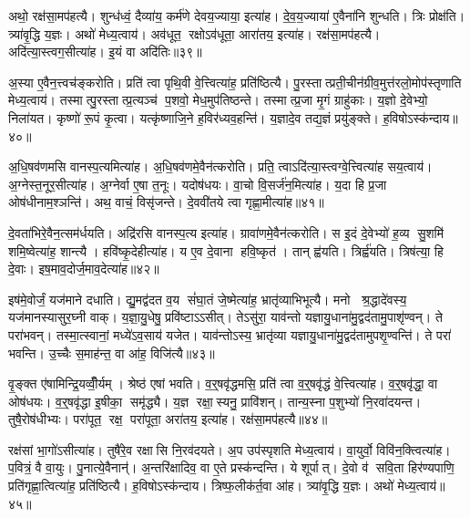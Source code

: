 अथो॒ रक्ष॑सा॒मप॑हत्यै। शुन्ध॑ध्वं॒ दैव्या॑य॒ कर्म॑णे देवय॒ज्याया॒ इत्या॑ह। दे॒व॒य॒ज्याया॑ ए॒वैना॑नि शुन्धति। त्रिः प्रोक्ष॑ति। त्र्या॑वृ॒द्धि य॒ज्ञः। अथो॑ मेध्य॒त्वाय॑। अव॑धूत॒ रक्षोऽव॑धूता॒ आरा॑तय॒ इत्या॑ह। रक्ष॑सा॒मप॑हत्यै। अदि॑त्या॒स्त्वग॒सीत्या॑ह। इ॒यं वा अदि॑तिः॥३९॥

अ॒स्या ए॒वैन॒त्त्वच॑ङ्करोति। प्रति॑ त्वा पृथि॒वी वे॒त्त्वित्या॑ह॒ प्रति॑ष्ठित्यै। पु॒रस्तात्प्रती॒चीन॑ग्रीव॒मुत्त॑रलो॒मोप॑स्तृणाति मेध्य॒त्वाय॑। तस्मात्पु॒रस्तात्प्र॒त्यञ्च॑ प॒शवो॒ मेध॒मुप॑तिष्ठन्ते। तस्मात्प्र॒जा मृ॒गं ग्राहु॑काः। य॒ज्ञो दे॒वेभ्यो॒ निला॑यत। कृष्णो॑ रू॒पं कृ॒त्वा। यत्कृ॑ष्णाजि॒ने ह॒विर॑ध्यव॒हन्ति॑। य॒ज्ञादे॒व तद्य॒ज्ञं प्रयु॑ङ्क्ते। ह॒विषोऽस्क॑न्दाय॥४०॥

अ॒धि॒षव॑णमसि वानस्प॒त्यमित्या॑ह। अ॒धि॒षव॑णमे॒वैन॑त्करोति। प्रति॒ त्वाऽदि॑त्या॒स्त्वग्वे॒त्त्वित्या॑ह सय॒त्वाय॑। अ॒ग्नेस्त॒नूर॒सीत्या॑ह। अ॒ग्नेर्वा ए॒षा त॒नूः। यदोष॑धयः। वा॒चो वि॒सर्ज॑न॒मित्या॑ह। य॒दा हि प्र॒जा ओष॑धीनाम॒श्ञन्ति॑। अथ॒ वाचं॒ विसृ॑जन्ते। दे॒ववी॑तये त्वा गृह्णा॒मीत्या॑ह॥४१॥

दे॒वता॑भिरे॒वैन॒त्सम॑र्धयति। अद्रि॑रसि वानस्प॒त्य इत्या॑ह। ग्रावा॑णमे॒वैन॑त्करोति। स इ॒दं दे॒वेभ्यो॑ ह॒व्य सु॒शमि॑ शमि॒ष्वेत्या॑ह॒ शान्त्यै। हवि॑ष्कृ॒देहीत्या॑ह। य ए॒व दे॒वाना हवि॒ष्कृत॑। तान्‌ ह्व॑यति। त्रिर्ह्व॑यति। त्रिष॑त्या॒ हि दे॒वाः। इष॒माव॒दोर्ज॒माव॒देत्या॑ह॥४२॥

इष॑मे॒वोर्जं॒ यज॑माने दधाति। द्यु॒मद्व॑दत व॒य सं॑घा॒तं जे॒ष्मेत्या॑ह॒ भ्रातृ॑व्याभिभूत्यै। मनो श्र॒द्धादे॑वस्य॒ यज॑मानस्यासुर॒घ्नी वाक्। य॒ज्ञा॒यु॒धेषु॒ प्रवि॑ष्टाऽऽसीत्। तेऽसु॑रा॒ याव॑न्तो यज्ञायु॒धाना॑मु॒द्वद॑तामु॒पाशृ॑ण्वन्। ते परा॑भवन्। तस्मा॒त्स्वानां॒ मध्ये॑ऽव॒साय॑ यजेत। याव॑न्तोऽस्य॒ भ्रातृ॑व्या यज्ञायु॒धाना॑मु॒द्वद॑तामुपशृ॒ण्वन्ति॑। ते परा॑ भवन्ति। उ॒च्चैः स॒माह॑न्त॒ वा आ॑ह॒ विजि॑त्यै॥४३॥

वृ॒ङ्क्त ए॑षामिन्द्रि॒यव्वीँ॒र्यम्। श्रेष्ठ॑ एषां भवति। व॒र्\mbox{}॒षवृ॑द्धमसि॒ प्रति॑ त्वा व॒र्\mbox{}॒षवृ॑द्धं वे॒त्त्वित्या॑ह। व॒र्\mbox{}॒षवृ॑द्धा॒ वा ओष॑धयः। व॒र्\mbox{}॒षवृ॑द्धा इ॒षीका॒ समृ॑द्ध्यै। य॒ज्ञ रक्षा॒स्यनु॒ प्रावि॑शन्। तान्य॒स्ना प॒शुभ्यो॑ नि॒रवा॑दयन्त। तुषै॒रोष॑धीभ्यः। परा॑पूत॒ रक्ष॒ परा॑पूता॒ अरा॑तय॒ इत्या॑ह। रक्ष॑सा॒मप॑हत्यै॥४४॥

रक्ष॑सां भा॒गो॑ऽसीत्या॑ह। तुषै॑रे॒व रक्षासि नि॒रव॑दयते। अ॒प उप॑स्पृशति मेध्य॒त्वाय॑। वा॒युर्वो॒ विवि॑न॒क्त्वित्या॑ह। प॒वित्रं॒ वै वा॒युः। पु॒नात्ये॒वैनान्॑। अ॒न्तरि॑क्षादिव॒ वा ए॒ते प्रस्क॑न्दन्ति। ये शूर्पात्। दे॒वो व॑ सवि॒ता हिर॑ण्यपाणि॒ प्रति॑गृह्णा॒त्वित्या॑ह॒ प्रति॑ष्ठित्यै। ह॒विषोऽस्क॑न्दाय। त्रिष्फ॒लीक॑र्त॒वा आ॑ह। त्र्या॑वृ॒द्धि य॒ज्ञः। अथो॑ मेध्य॒त्वाय॑॥४५॥\anuvakamend[द्वाभ्या॒मुत्पु॑नाति र॒श्मयो॑ नय॒न्त्यग्रे॑ य॒ज्ञप॑तिय्यँ॒ज्ञोऽदि॑ति॒रस्क॑न्दाय गृह्णा॒मीत्या॑ह व॒देत्या॑ह॒ विजि॑त्या॒ अप॑हत्या॒ अस्क॑न्दाय॒ त्रीणि॑ च]

